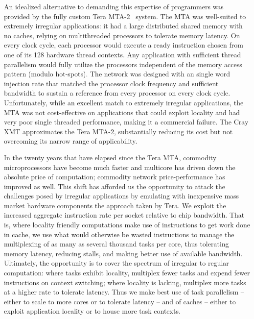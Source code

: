 An idealized alternative to demanding this expertise of programmers was provided by the fully custom Tera MTA-2~\cite{mta-2} system.  The MTA was well-suited to extremely irregular applications: it had a large distributed shared memory with no caches, relying on multithreaded processors to tolerate memory latency.  On every clock cycle, each processor would execute a ready instruction chosen from one of its 128 hardware thread contexts.  Any application with sufficient thread parallelism would fully utilize the processors independent of the memory access pattern (modulo hot-spots).  The network was designed with an single word injection rate that matched the processor clock frequency and sufficient bandwidth to sustain a reference from every processor on every clock cycle.  Unfortunately, while an excellent match to extremely irregular applications, the MTA was not cost-effective on applications that could exploit locality and had very poor single threaded performance, making it a commercial failure.  The Cray XMT approximates the Tera MTA-2, substantially reducing its cost but not overcoming its narrow range of applicability.

In the twenty years that have elapsed since the Tera MTA, commodity microprocessors have become much faster and multicore has driven down the absolute price of computation; commodity network price-performance has improved as well.  This shift has afforded us the opportunity to attack the challenges posed by irregular applications by emulating with inexpensive mass market hardware components the approach taken by Tera. We exploit the increased aggregate instruction rate per socket relative to chip bandwidth.  That is, where locality friendly computations make use of instructions to get work done in cache, we use what would otherwise be wasted instructions to manage the multiplexing of as many as several thousand tasks per core, thus tolerating memory latency, reducing stalls, and making better use of available bandwidth.  Ultimately, the opportunity is to cover the spectrum of irregular to regular computation:  where tasks exhibit locality, multiplex fewer tasks and expend fewer instructions on context switching; where locality is lacking, multiplex more tasks at a higher rate to tolerate latency.  Thus we make best use of task parallelism -- either to scale to more cores or to tolerate latency -- and of caches -- either to exploit application locality or to house more task contexts.


